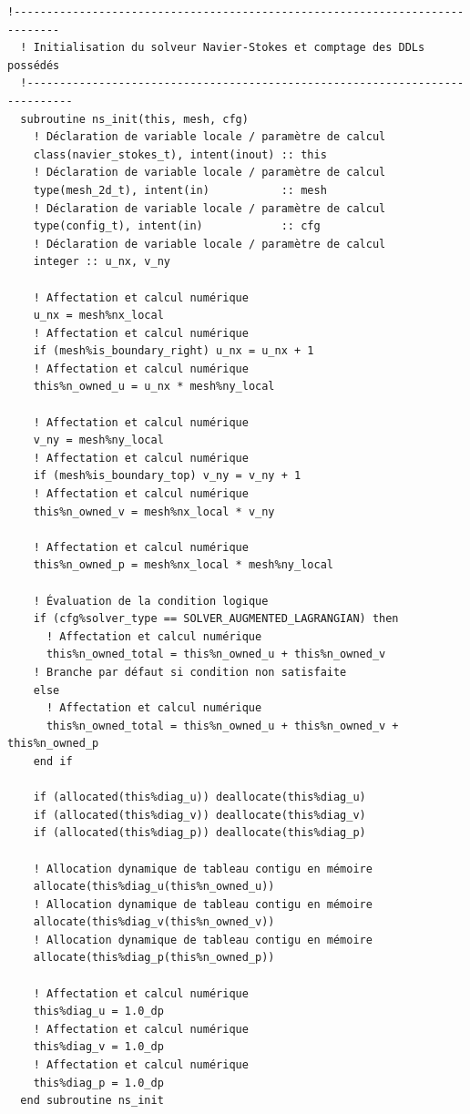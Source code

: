 \documentclass[10pt,a4paper,oneside]{book}
\begin{document}
\begin{lstlisting}[language={[95]Fortran}]
  !-----------------------------------------------------------------------------
  ! Initialisation du solveur Navier-Stokes et comptage des DDLs possédés
  !-----------------------------------------------------------------------------
  subroutine ns_init(this, mesh, cfg)
    ! Déclaration de variable locale / paramètre de calcul
    class(navier_stokes_t), intent(inout) :: this
    ! Déclaration de variable locale / paramètre de calcul
    type(mesh_2d_t), intent(in)           :: mesh
    ! Déclaration de variable locale / paramètre de calcul
    type(config_t), intent(in)            :: cfg
    ! Déclaration de variable locale / paramètre de calcul
    integer :: u_nx, v_ny

    ! Affectation et calcul numérique
    u_nx = mesh%nx_local
    ! Affectation et calcul numérique
    if (mesh%is_boundary_right) u_nx = u_nx + 1
    ! Affectation et calcul numérique
    this%n_owned_u = u_nx * mesh%ny_local

    ! Affectation et calcul numérique
    v_ny = mesh%ny_local
    ! Affectation et calcul numérique
    if (mesh%is_boundary_top) v_ny = v_ny + 1
    ! Affectation et calcul numérique
    this%n_owned_v = mesh%nx_local * v_ny

    ! Affectation et calcul numérique
    this%n_owned_p = mesh%nx_local * mesh%ny_local

    ! Évaluation de la condition logique
    if (cfg%solver_type == SOLVER_AUGMENTED_LAGRANGIAN) then
      ! Affectation et calcul numérique
      this%n_owned_total = this%n_owned_u + this%n_owned_v
    ! Branche par défaut si condition non satisfaite
    else
      ! Affectation et calcul numérique
      this%n_owned_total = this%n_owned_u + this%n_owned_v + this%n_owned_p
    end if

    if (allocated(this%diag_u)) deallocate(this%diag_u)
    if (allocated(this%diag_v)) deallocate(this%diag_v)
    if (allocated(this%diag_p)) deallocate(this%diag_p)

    ! Allocation dynamique de tableau contigu en mémoire
    allocate(this%diag_u(this%n_owned_u))
    ! Allocation dynamique de tableau contigu en mémoire
    allocate(this%diag_v(this%n_owned_v))
    ! Allocation dynamique de tableau contigu en mémoire
    allocate(this%diag_p(this%n_owned_p))

    ! Affectation et calcul numérique
    this%diag_u = 1.0_dp
    ! Affectation et calcul numérique
    this%diag_v = 1.0_dp
    ! Affectation et calcul numérique
    this%diag_p = 1.0_dp
  end subroutine ns_init


\end{lstlisting}
\end{document}
